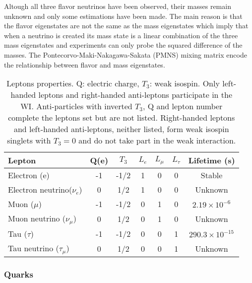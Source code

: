 \noindent Altough all three flavor neutrinos have been observed, their masses remain unknown and only some estimations have been made\cite{nu_mass}. The main reason is that the flavor eigenstates are not the same as the mass eigenstates which imply that when a neutrino is created its mass state is a linear combination of the three mass eigenstates and experiments can only probe the squared difference of the masses. The Pontecorvo-Maki-Nakagawa-Sakata (PMNS) mixing matrix encode the relationship between flavor and mass eigenstates.
\begin{center}
\begin{table}[h]
\centering
\footnotesize
\begin{tabular}{lcccccc} \hline
Lepton                      & Q(e) & $T_3$&$L_e$ & $L_\mu$ & $L_\tau$ & Lifetime (s)                \\ \hline
Electron (e)                & -1   & -1/2 & 1    & 0       & 0        & Stable                      \\ %
Electron neutrino($\nu_e$)  & 0    &  1/2 & 1    & 0       & 0        & Unknown                     \\ %
Muon ($\mu$)                & -1   & -1/2 & 0    & 1       & 0        & $2.19\times10^{-6}$\\ %
Muon neutrino ($\nu_\mu$)   & 0    &  1/2 & 0    & 1       & 0        & Unknown                     \\ %
Tau ($\tau$)                & -1   & -1/2 & 0    & 0       & 1        & $290.3\times10^{-15}$    \\ %
Tau neutrino ($\tau_\mu$)   & 0    &  1/2 & 0    & 0       & 1        & Unknown                     \\ \hline
\end{tabular}
\caption[Leptons properties.]{Leptons properties\cite{pdg}. Q: electric charge, $T_3$: weak isospin. Only left-handed leptons and right-handed anti-leptons participate in the WI. Anti-particles with inverted $T_3$, Q and lepton number complete the leptons set but are not listed. Right-handed leptons and left-handed anti-leptons, neither listed, form weak isospin singlets with $T_3=0$ and do not take part in the weak interaction.}\label{leptons}
\end{table}
\end{center}

\subsubsection{Quarks}

